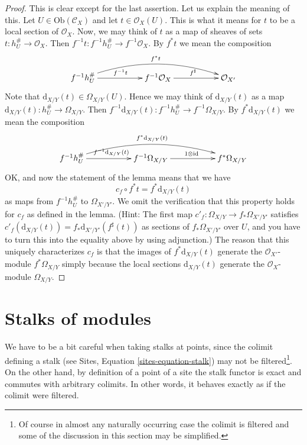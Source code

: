 \begin{proof}
This is clear except for the last assertion. Let us explain the meaning of
this. Let $U \in \text{Ob}(\mathcal{C}_X)$ and let $t \in \mathcal{O}_X(U)$.
This is what it means for $t$ to be a local section of $\mathcal{O}_X$.
Now, we may think of $t$ as a map of sheaves of sets
$t : h_U^\# \to \mathcal{O}_X$. Then
$f^{-1}t : f^{-1}h_U^\# \to f^{-1}\mathcal{O}_X$. By $f^*t$ we mean
the composition
$$
\xymatrix{
f^{-1}h_U^\# \ar[rr]^{f^{-1}t} \ar@/^4ex/[rrrr]^{f^*t} & &
f^{-1}\mathcal{O}_X \ar[rr]^{f^\sharp} & &
\mathcal{O}_{X'}
}
$$
Note that $\text{d}_{X/Y}(t) \in \Omega_{X/Y}(U)$. Hence we may think of
$\text{d}_{X/Y}(t)$ as a map $\text{d}_{X/Y}(t) : h_U^\# \to \Omega_{X/Y}$.
Then $f^{-1}\text{d}_{X/Y}(t) : f^{-1}h_U^\# \to f^{-1}\Omega_{X/Y}$.
By $f^*\text{d}_{X/Y}(t)$ we mean the composition
$$
\xymatrix{
f^{-1}h_U^\#
\ar[rr]^{f^{-1}\text{d}_{X/Y}(t)}
\ar@/^4ex/[rrrr]^{f^*\text{d}_{X/Y}(t)} & &
f^{-1}\Omega_{X/Y} \ar[rr]^{1 \otimes \text{id}} & &
f^*\Omega_{X/Y}
}
$$
OK, and now the statement of the lemma means that we have
$$
c_f \circ f^*t = f^*\text{d}_{X/Y}(t)
$$
as maps from $f^{-1}h_U^\#$ to $\Omega_{X'/Y'}$. We omit the verification
that this property holds for $c_f$ as defined in the lemma. (Hint: The first
map $c'_f : \Omega_{X/Y} \to f_*\Omega_{X'/Y'}$ satisfies
$c'_f(\text{d}_{X/Y}(t)) = f_*\text{d}_{X'/Y'}(f^\sharp(t))$ as sections of
$f_*\Omega_{X'/Y'}$ over $U$, and you have to
turn this into the equality above by using adjunction.)
The reason that this uniquely characterizes $c_f$ is that the images
of $f^*\text{d}_{X/Y}(t)$ generate the $\mathcal{O}_{X'}$-module
$f^*\Omega_{X/Y}$ simply because the local sections $\text{d}_{X/Y}(t)$
generate the $\mathcal{O}_X$-module $\Omega_{X/Y}$.
\end{proof}









\section{Stalks of modules}
\label{section-stalks}

\noindent
We have to be a bit careful when taking stalks at points,
since the colimit defining a stalk (see
Sites, Equation \ref{sites-equation-stalk})
may not be filtered\footnote{Of course in almost any naturally occurring
case the colimit is filtered and some of the discussion in this section
may be simplified.}. On the other hand, by definition of a point of a site
the stalk functor is exact and commutes with arbitrary colimits.
In other words, it behaves exactly as if the colimit were filtered.

